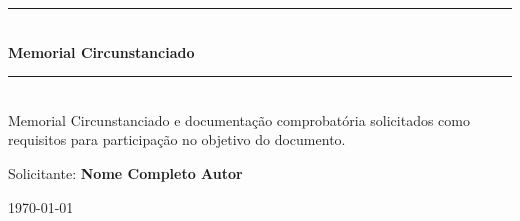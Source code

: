 \documentclass[a4paper,oneside,12pt]{article}
\newcommand{\Title}{Memorial Circunstanciado}
\newcommand{\Author}{Nome Completo Autor}
\newcommand{\Subject}{Memorial Circunstanciado e documentação comprobatória solicitados como requisitos para participação no objetivo do documento. }
\newcounter{document}%
\begin{document}
\begin{titlepage}

\vspace{-5.0cm}


\begin{center}
\vspace{1cm}

\begin{figure}[!htb]
 \label{fig:Instituicao_logo}
\end{figure}



\rule{1.0\textwidth}{1pt} \\ [0.5cm]
{\Huge \textbf{\textsf{\Title}}} \\ 
\rule{1.0\textwidth}{1pt} \\ 



\doublespacing
\vspace{2cm}
{\Large \textsf{\Subject}}\\
\vspace{2cm}



{\LARGE \textsf{Solicitante: \textbf{\Author}}}\\


\vspace{2.0cm}
\doublespacing


\normalsize \textsf{\today}

\end{center}
\thispagestyle{empty}
\end{titlepage}



  \tableofcontents


\end{document}
